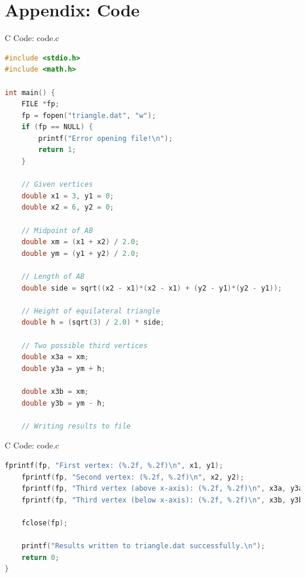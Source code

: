 \documentclass{beamer}
\numberwithin{equation}{section}
\theoremstyle{remark}
\begin{document}
\section*{Appendix: Code}

\begin{frame}[fragile]{C Code: code.c}
\begin{lstlisting}[language=C]
#include <stdio.h>
#include <math.h>

int main() {
    FILE *fp;
    fp = fopen("triangle.dat", "w");
    if (fp == NULL) {
        printf("Error opening file!\n");
        return 1;
    }

    // Given vertices
    double x1 = 3, y1 = 0;
    double x2 = 6, y2 = 0;

    // Midpoint of AB
    double xm = (x1 + x2) / 2.0;
    double ym = (y1 + y2) / 2.0;

    // Length of AB
    double side = sqrt((x2 - x1)*(x2 - x1) + (y2 - y1)*(y2 - y1));

    // Height of equilateral triangle
    double h = (sqrt(3) / 2.0) * side;

    // Two possible third vertices
    double x3a = xm;
    double y3a = ym + h;

    double x3b = xm;
    double y3b = ym - h;

    // Writing results to file
    \end{lstlisting}
\end{frame}

\begin{frame}[fragile]{C Code: code.c}
\begin{lstlisting}[language=C]
    fprintf(fp, "First vertex: (%.2f, %.2f)\n", x1, y1);
    fprintf(fp, "Second vertex: (%.2f, %.2f)\n", x2, y2);
    fprintf(fp, "Third vertex (above x-axis): (%.2f, %.2f)\n", x3a, y3a);
    fprintf(fp, "Third vertex (below x-axis): (%.2f, %.2f)\n", x3b, y3b);

    fclose(fp);

    printf("Results written to triangle.dat successfully.\n");
    return 0;
}
\end{lstlisting}
\end{frame}
\end{document}
